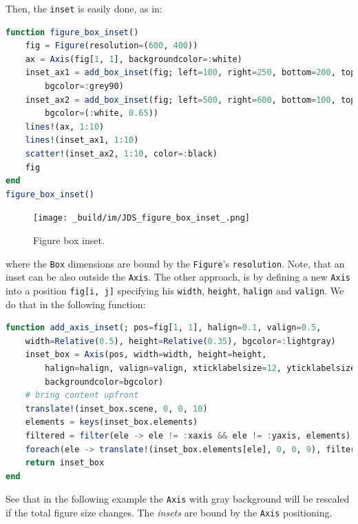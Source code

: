 \documentclass[
  notoc %
]{tufte-book}
\newcommand{\passthrough}[1]{#1}
\begin{document}
Then, the \passthrough{\lstinline!inset!} is easily done, as in:

\begin{lstlisting}[language=Julia]
function figure_box_inset()
    fig = Figure(resolution=(600, 400))
    ax = Axis(fig[1, 1], backgroundcolor=:white)
    inset_ax1 = add_box_inset(fig; left=100, right=250, bottom=200, top=300,
        bgcolor=:grey90)
    inset_ax2 = add_box_inset(fig; left=500, right=600, bottom=100, top=200,
        bgcolor=(:white, 0.65))
    lines!(ax, 1:10)
    lines!(inset_ax1, 1:10)
    scatter!(inset_ax2, 1:10, color=:black)
    fig
end
figure_box_inset()
\end{lstlisting}

\begin{figure}
\hypertarget{fig:figure_box_inset}{%
\centering
\texttt{[image: \_build/im/JDS\_figure\_box\_inset\_.png]}
\caption{Figure box inset.}\label{fig:figure_box_inset}
}
\end{figure}

where the \passthrough{\lstinline!Box!} dimensions are bound by the
\passthrough{\lstinline!Figure!}'s \passthrough{\lstinline!resolution!}.
Note, that an inset can be also outside the
\passthrough{\lstinline!Axis!}. The other approach, is by defining a new
\passthrough{\lstinline!Axis!} into a position
\passthrough{\lstinline!fig[i, j]!} specifying his
\passthrough{\lstinline!width!}, \passthrough{\lstinline!height!},
\passthrough{\lstinline!halign!} and \passthrough{\lstinline!valign!}.
We do that in the following function:

\begin{lstlisting}[language=Julia]
function add_axis_inset(; pos=fig[1, 1], halign=0.1, valign=0.5,
    width=Relative(0.5), height=Relative(0.35), bgcolor=:lightgray)
    inset_box = Axis(pos, width=width, height=height,
        halign=halign, valign=valign, xticklabelsize=12, yticklabelsize=12,
        backgroundcolor=bgcolor)
    # bring content upfront
    translate!(inset_box.scene, 0, 0, 10)
    elements = keys(inset_box.elements)
    filtered = filter(ele -> ele != :xaxis && ele != :yaxis, elements)
    foreach(ele -> translate!(inset_box.elements[ele], 0, 0, 9), filtered)
    return inset_box
end
\end{lstlisting}

See that in the following example the \passthrough{\lstinline!Axis!}
with gray background will be rescaled if the total figure size changes.
The \emph{insets} are bound by the \passthrough{\lstinline!Axis!}
positioning.
\end{document}
